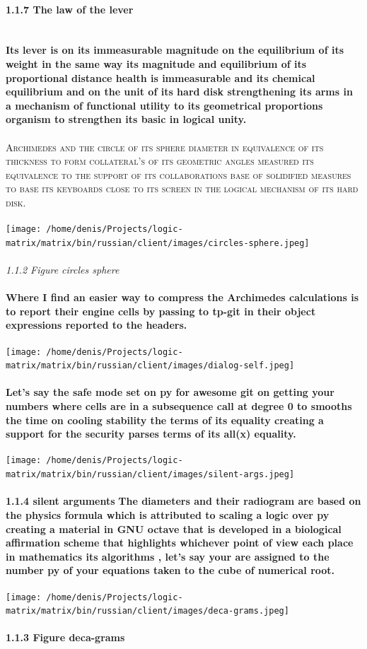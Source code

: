 \paragraph{1.1.7 The law of the lever}
\textbf{\\}
\textbf{Its lever is on its immeasurable magnitude on the equilibrium of its weight in the same way its magnitude and equilibrium of its proportional distance health is immeasurable and its chemical equilibrium and on the unit of its hard disk strengthening its arms in a mechanism of functional utility to its geometrical proportions organism to strengthen its basic in logical unity.}
\textbf{\\\\}
\textsc{Archimedes and the circle of its sphere diameter in equivalence of its thickness to form collateral's of its geometric angles measured its equivalence to the support of its collaborations base of solidified measures to base its keyboards close to its screen in the logical mechanism of its hard disk.}
\textbf{\\\\}
\texttt{[image: /home/denis/Projects/logic-matrix/matrix/bin/russian/client/images/circles-sphere.jpeg]}
\textbf{\\\\}
\textit{1.1.2 Figure circles sphere}
\textbf{\\\\}
\textbf{Where I find an easier way to compress the Archimedes calculations is to report their engine cells by passing to tp-git in their object expressions reported to the headers.}
\textbf{\\\\}
\texttt{[image: /home/denis/Projects/logic-matrix/matrix/bin/russian/client/images/dialog-self.jpeg]}
\textbf{\\\\}
\textbf{Let's say the safe mode set on py for awesome git on getting your numbers where cells are in a subsequence call at degree 0 to smooths the time on cooling stability the terms of its equality creating a support for the security parses terms of its all(x) equality.}
\textbf{\\\\}
\texttt{[image: /home/denis/Projects/logic-matrix/matrix/bin/russian/client/images/silent-args.jpeg]}
\textbf{\\\\}
\textbf{1.1.4 silent arguments}
\textbf{The diameters and their radiogram are based on the physics formula which is attributed to scaling a logic over py creating a material in GNU octave that is developed in a biological affirmation scheme that highlights whichever point of view each place in mathematics its algorithms , let's say your are assigned to the number py of your equations taken to the cube of numerical root.}
\textbf{\\\\}
\texttt{[image: /home/denis/Projects/logic-matrix/matrix/bin/russian/client/images/deca-grams.jpeg]}
\textbf{\\\\}
\textbf{1.1.3 Figure deca-grams}
\textbf{\\\\}
